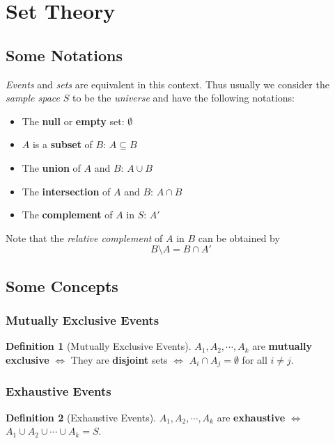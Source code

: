 \documentclass[10pt,UTF8]{article}
\newenvironment{tipbox}
{\begin{tcolorbox}[colback=green!5!white,colframe=green!75!black]}
{\end{tcolorbox}}
\newenvironment{definition box}
{\begin{tcolorbox}[colback=blue!5!white,colframe=blue!75!black,parbox=false,before upper=\par,before lower=\par]}
{\end{tcolorbox}}
\newenvironment{theorem box}
{\begin{tcolorbox}[colback=yellow!5!white,colframe=yellow!75!black,parbox=false,before upper=\par,before lower=\par]}
{\end{tcolorbox}}
\theoremstyle{definition}
\newtheorem{definition inner}{Definition}[section]
\newenvironment{definition}[1][]
{\begin{definition box}\begin{definition inner}[#1]\hfill\par}
{\end{definition inner}\end{definition box}}
\theoremstyle{plain}
\newtheorem{theorem inner}{Theorem}[section]
\theoremstyle{definition}
\newtheorem*{proof inner}{\textit{Proof}}
\theoremstyle{remark}
\begin{document}
\section{Set Theory}

\subsection{Some Notations}

\emph{Events} and \emph{sets} are equivalent in this context.
Thus usually we consider the \emph{sample space} $S$ to be the \emph{universe}
and have the following notations:

\begin{itemize}
    \item The \textbf{null} or \textbf{empty} set: $\emptyset$
    \item $A$ is a \textbf{subset} of $B$: $A \subseteq B$
    \item The \textbf{union} of $A$ and $B$: $A \cup B$
    \item The \textbf{intersection} of $A$ and $B$: $A \cap B$
    \item The \textbf{complement} of $A$ in $S$: $A'$
\end{itemize}

\begin{tipbox}
Note that the \emph{relative complement} of $A$ in $B$ can be obtained by
\[B\setminus A = B \cap A'\]
\end{tipbox}

\subsection{Some Concepts}

\subsubsection{Mutually Exclusive Events}
\begin{definition}[Mutually Exclusive Events]
    $A_1, A_2, \cdots, A_k$ are \textbf{mutually exclusive} $\iff$
    They are \textbf{disjoint} sets $\iff$
    $A_i \cap A_j = \emptyset$ for all $i \neq j$.
\end{definition}

\subsubsection{Exhaustive Events}
\begin{definition}[Exhaustive Events]
    $A_1, A_2, \cdots, A_k$ are \textbf{exhaustive} $\iff$
    $A_1 \cup A_2 \cup \cdots \cup A_k = S$.
\end{definition}
\end{document}
